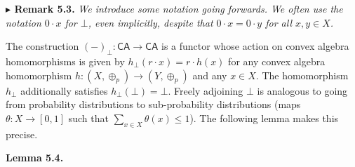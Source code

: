 \par\medskip
\hypertarget{html:S5.Thmtheorem3}{} \par\noindent\textbf{%
\hypertarget{html:S5.Thmtheorem3.m1}{}\({\blacktriangleright}\) Remark 5.3.}\quad  %
\hypertarget{html:S5.Thmtheorem3.p1}{} \emph{We introduce some notation going forwards. We often use the notation %
\hypertarget{html:S5.Thmtheorem3.p1.m1}{}\({0\cdot x}\) for %
\hypertarget{html:S5.Thmtheorem3.p1.m2}{}\({\bot}\), even implicitly, despite that %
\hypertarget{html:S5.Thmtheorem3.p1.m3}{}\({0\cdot x=0\cdot y}\) for all %
\hypertarget{html:S5.Thmtheorem3.p1.m4}{}\({x,y\in X}\).}
\par\medskip
\hypertarget{html:S5.SS0.SSS0.P0.SPx3.p2}{} The construction %
\hypertarget{html:S5.SS0.SSS0.P0.SPx3.p2.m1}{}\({(-)_{\bot}\colon\mathsf{CA}\to\mathsf{CA}}\) is a functor whose action on convex algebra homomorphisms is given by %
\hypertarget{html:S5.SS0.SSS0.P0.SPx3.p2.m2}{}\({h_{\bot}(r\cdot x)=r\cdot h(x)}\) for any convex algebra homomorphism %
\hypertarget{html:S5.SS0.SSS0.P0.SPx3.p2.m3}{}\({h\colon(X,\oplus_{p})\to(Y,\oplus_{p})}\) and any %
\hypertarget{html:S5.SS0.SSS0.P0.SPx3.p2.m4}{}\({x\in X}\). The homomorphism %
\hypertarget{html:S5.SS0.SSS0.P0.SPx3.p2.m5}{}\({h_{\bot}}\) additionally satisfies %
\hypertarget{html:S5.SS0.SSS0.P0.SPx3.p2.m6}{}\({h_{\bot}(\bot)=\bot}\). Freely adjoining %
\hypertarget{html:S5.SS0.SSS0.P0.SPx3.p2.m7}{}\({\bot}\) is analogous to going from probability distributions to sub-probability distributions (maps %
\hypertarget{html:S5.SS0.SSS0.P0.SPx3.p2.m8}{}\({\theta\colon X\to[0,1]}\) such that %
\hypertarget{html:S5.SS0.SSS0.P0.SPx3.p2.m9}{}\({\sum_{x\in X}\theta(x)\leq 1}\)). The following lemma makes this precise.
\par\medskip
\hypertarget{html:S5.Thmtheorem4}{} \par\noindent\textbf{\textbf{Lemma 5.4}\textbf{.}}\quad  %
